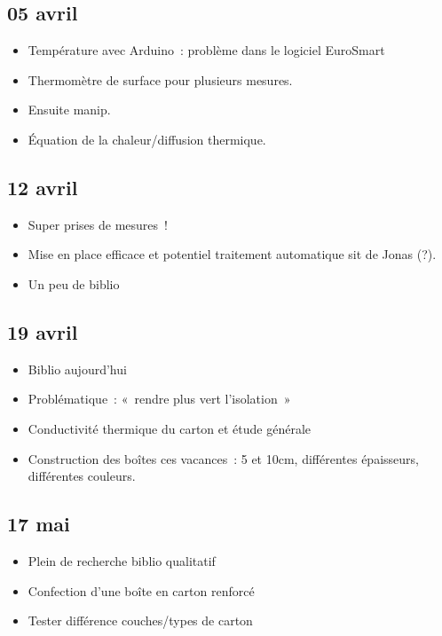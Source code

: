 \documentclass[a4paper, 11pt, final, garamond]{book}
\begin{document}
\subsection{05 avril}
\begin{itemize}
	\item Température avec Arduino~: problème dans le logiciel EuroSmart
	\item Thermomètre de surface pour plusieurs mesures.
	\item Ensuite manip.
	\item Équation de la chaleur/diffusion thermique.
\end{itemize}

\subsection{12 avril}
\begin{itemize}
	\item Super prises de mesures~!
	\item Mise en place efficace et potentiel traitement automatique sit de
	      Jonas (?).
	\item Un peu de biblio
\end{itemize}

\subsection{19 avril}
\begin{itemize}
	\item Biblio aujourd'hui
	\item Problématique~: «~rendre plus vert l'isolation~»
	\item Conductivité thermique du carton et étude générale
	\item Construction des boîtes ces vacances~: 5 et 10cm, différentes
	      épaisseurs, différentes couleurs.
\end{itemize}

\subsection{17 mai}
\begin{itemize}
	\item Plein de recherche biblio qualitatif
	\item Confection d'une boîte en carton renforcé
	\item Tester différence couches/types de carton
\end{itemize}
\end{document}
